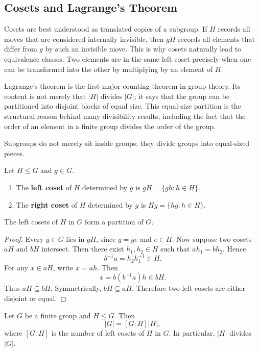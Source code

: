 \subsection{Cosets and Lagrange's Theorem}


Cosets are best understood as translated copies of a subgroup. If $H$ records all moves that are considered internally invisible, then $gH$ records all elements that differ from $g$ by such an invisible move. This is why cosets naturally lead to equivalence classes. Two elements are in the same left coset precisely when one can be transformed into the other by multiplying by an element of $H$.

Lagrange's theorem is the first major counting theorem in group theory. Its content is not merely that $|H|$ divides $|G|$; it says that the group can be partitioned into disjoint blocks of equal size. This equal-size partition is the structural reason behind many divisibility results, including the fact that the order of an element in a finite group divides the order of the group.

Subgroups do not merely sit inside groups; they divide groups into equal-sized pieces.

\begin{definition}[Cosets]
Let $H\leq G$ and $g\in G$.
\begin{enumerate}
    \item The \textbf{left coset} of $H$ determined by $g$ is $gH=\{gh:h\in H\}$.
    \item The \textbf{right coset} of $H$ determined by $g$ is $Hg=\{hg:h\in H\}$.
\end{enumerate}
\end{definition}

\begin{proposition}
The left cosets of $H$ in $G$ form a partition of $G$.
\end{proposition}

\begin{proof}
Every $g\in G$ lies in $gH$, since $g=ge$ and $e\in H$. Now suppose two cosets $aH$ and $bH$ intersect. Then there exist $h_1,h_2\in H$ such that $ah_1=bh_2$. Hence
\[
    b^{-1}a=h_2h_1^{-1}\in H.
\]
For any $x\in aH$, write $x=ah$. Then
\[
    x=b(b^{-1}a)h\in bH.
\]
Thus $aH\subseteq bH$. Symmetrically, $bH\subseteq aH$. Therefore two left cosets are either disjoint or equal.
\end{proof}

\begin{theorem}
Let $G$ be a finite group and $H\leq G$. Then
\[
    |G|=[G:H]|H|,
\]
where $[G:H]$ is the number of left cosets of $H$ in $G$. In particular, $|H|$ divides $|G|$.
\end{theorem}

